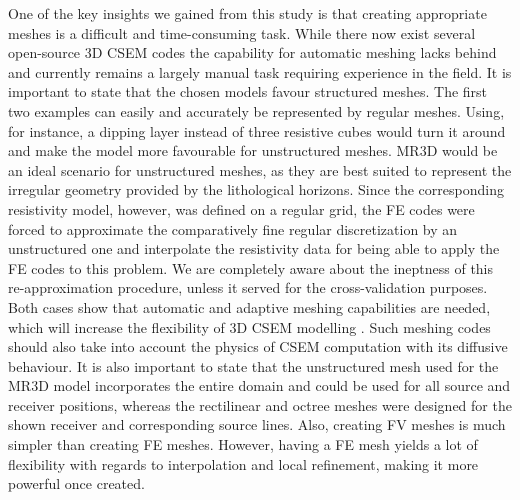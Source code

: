 \documentclass[extra, camera,%
]{gji}
\begin{document}
One of the key insights we gained from this study is that creating appropriate meshes is a difficult and time-consuming task. While there now exist several open-source 3D CSEM codes the capability for automatic meshing lacks behind and currently remains a largely manual task requiring experience in the field. It is important to state that the chosen models favour structured meshes. The first two examples can easily and accurately be represented by regular meshes. Using, for instance, a dipping layer instead of three resistive cubes would turn it around and make the model more favourable for unstructured meshes. MR3D would be an ideal scenario for unstructured meshes, as they are best suited to represent the irregular geometry provided by the lithological horizons. Since the corresponding resistivity model, however, was defined on a regular grid, the FE codes were forced to approximate the comparatively fine regular discretization by an unstructured one and interpolate the resistivity data for being able to apply the FE codes to this problem. We are completely aware about the ineptness of this re-approximation procedure, unless it served for the cross-validation purposes. Both cases show that automatic and adaptive meshing capabilities are needed, which will increase the flexibility of 3D CSEM modelling \citep{GJI.11.Schwarzbach,GJI.16.Key,GJI.19.CastilloReyes}. Such meshing codes should also take into account the physics of CSEM computation with its diffusive behaviour. It is also important to state that the unstructured mesh used for the MR3D model incorporates the entire domain and could be used for all source and receiver positions, whereas the rectilinear and octree meshes were designed for the shown receiver and corresponding source lines. Also, creating FV meshes is much simpler than creating FE meshes. However, having a FE mesh yields a lot of flexibility with regards to interpolation and local refinement, making it more powerful once created.
\end{document}
